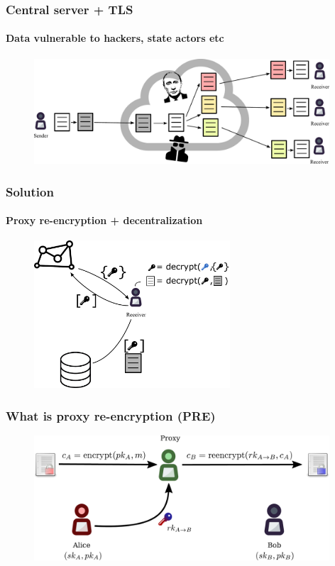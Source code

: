 \documentclass[xetex,mathsans,sans,aspectratio=169]{beamer}
\begin{document}
    \begin{frame}
        \frametitle{Central server + TLS}
        \framesubtitle{Data vulnerable to hackers, state actors etc}
        \begin{figure}
            \centering
            \includegraphics[width=11cm]{pdf/file-sharing-tls.pdf}
        \end{figure}
    \end{frame}

    \begin{frame}
        \frametitle{Solution}
        \framesubtitle{Proxy re-encryption + decentralization}
        \begin{figure}
            \centering
            \includegraphics[height=5.5cm]{pdf/pre-kms.pdf}
        \end{figure}
    \end{frame}

    \begin{frame}
        \frametitle{What is proxy re-encryption (PRE)}
        \begin{figure}
            \centering
            \includegraphics[width=11cm]{pdf/pre.pdf}
        \end{figure}
    \end{frame}
\end{document}

